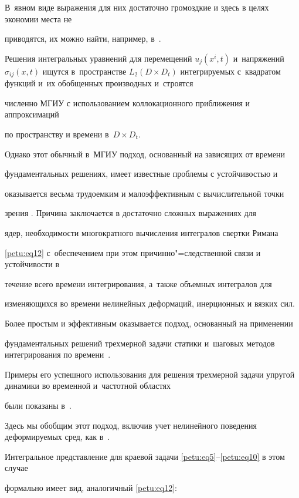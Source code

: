 В~явном виде выражения для них достаточно громоздкие и здесь в целях экономии места не

приводятся, их можно найти, например, в~\cite{petu:bib2}.



Решения интегральных уравнений для перемещений $u_j (x^i,t)$ и~напряжений $\sigma _{ij} (x,t)$ ищутся в~пространстве $L_2 (D\times D_t )$ интегрируемых с~квадратом функций и~их обобщенных производных и~строятся

численно МГИУ с использованием коллокационного приближения и аппроксимаций

по пространству и времени в~$D\times D_t$.



Однако этот обычный в~МГИУ подход, основанный на зависящих от времени

фундаментальных решениях, имеет известные проблемы с устойчивостью и

оказывается весьма трудоемким и малоэффективным с вычислительной точки

зрения \cite{petu:bib3,petu:bib9,petu:bib11}. Причина заключается в достаточно сложных выражениях для

ядер, необходимости многократного вычисления интегралов свертки Римана

\eqref{petu:eq12} с~обеспечением при этом причинно"=следственной связи и устойчивости в

течение всего времени интегрирования, а~также объемных интегралов для

изменяющихся во времени нелинейных деформаций, инерционных и вязких сил.



Более простым и эффективным оказывается подход, основанный на применении

фундаментальных решений трехмерной задачи статики и~шаговых методов интегрирования по времени~\cite{petu:bib11}.

Примеры его успешного использования для решения трехмерной задачи упругой динамики во временной и~частотной областях

были показаны в~\cite{petu:bib12}. 

Здесь мы обобщим этот подход, включив учет нелинейного поведения деформируемых сред, как в~\cite{petu:bib14,petu:bib15}.



Интегральное представление для краевой задачи \eqref{petu:eq5}--\eqref{petu:eq10} в этом случае

формально имеет вид, аналогичный \eqref{petu:eq12}:

